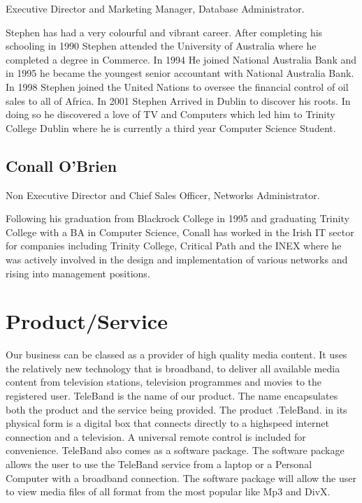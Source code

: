 \documentclass[a4paper,12pt]{article}
\begin{document}
Executive Director and Marketing Manager, Database Administrator.


Stephen has had a very colourful and vibrant career. After completing
his schooling in 1990 Stephen attended the University of Australia where
he completed a degree in Commerce. In 1994 He joined National Australia
Bank and in 1995 he became the youngest senior accountant with National
Australia Bank. In 1998 Stephen joined the United Nations to oversee the
financial control of oil sales to all of Africa. In 2001 Stephen Arrived
in Dublin to discover his roots. In doing so he discovered a love of TV
and Computers which led him to Trinity College Dublin where he is
currently a third year Computer Science Student.


\subsection{Conall O'Brien}

Non Executive Director and Chief Sales Officer, Networks Administrator. 


Following his graduation from Blackrock College in 1995 and graduating
Trinity College with a BA in Computer Science, Conall has worked in the
Irish IT sector for companies including Trinity College, Critical Path
and the INEX where he was actively involved in the design and
implementation of various networks and rising into management positions.

\section{Product/Service}

Our business can be classed as a provider of high quality media content.
It uses the relatively new technology that is broadband, to deliver all
available media content from television stations, television programmes
and movies to the registered user. TeleBand is the name of our product.
The name encapsulates both the product and the service being provided.
The product .TeleBand. in its physical form is a digital box that
connects directly to a highspeed internet connection and a television. A
universal remote control is included for convenience. TeleBand also
comes as a software package. The software package allows the user to use
the TeleBand service from a laptop or a Personal Computer with a
broadband connection. The software package will allow the user to view
media files of all format from the most popular like Mp3 and DivX.
\end{document}
